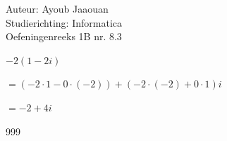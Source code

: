 \documentclass[a4paper]{article}
\begin{document}
\noindent \large Auteur: Ayoub Jaaouan \\
\noindent \large Studierichting: Informatica\\
\noindent \large Oefeningenreeks 1B nr. 8.3\\

\medskip

\normalsize

$-2(1-2i)$

$= \left(-2 \cdot 1 - 0 \cdot (-2)\right) + \left(-2 \cdot (-2) + 0 \cdot 1\right)i$

$= -2 + 4i$

\begin{thebibliography}{999}
\end{thebibliography}
\end{document}

